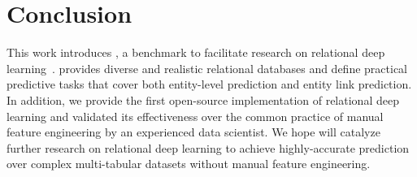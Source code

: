 \section{Conclusion}
\label{sec:conclusion}


This work introduces \relbench, a benchmark to facilitate research on relational deep learning~\citep{fey2023relational}. 
\relbench provides diverse and realistic relational databases and define practical predictive tasks that cover both entity-level prediction and entity link prediction.
In addition, we provide the first open-source implementation of relational deep learning and validated its effectiveness over the common practice of manual feature engineering by an experienced data scientist.
We hope \relbench will catalyze further research on relational deep learning to achieve highly-accurate prediction over complex multi-tabular datasets without manual feature engineering.

